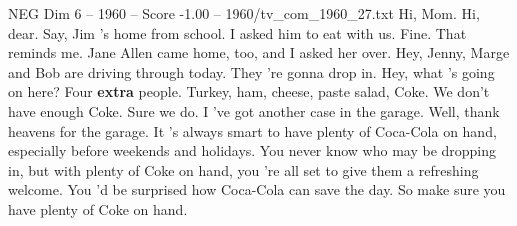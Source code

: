 \begin{textsample}{NEG Dim 6 – 1960 – Score -1.00 – 1960/tv\_com\_1960\_27.txt}  \label{ex:f6_neg_075}
Hi, Mom.
Hi, dear.
Say, Jim 's home from school.
I asked him to eat with us.
Fine.
That reminds me.
Jane Allen came home, too, and I asked her over.
Hey, Jenny, Marge and Bob are driving through today.
They 're gonna drop in.
Hey, what 's going on here?
Four \textbf{extra} people.
Turkey, ham, cheese, paste salad, Coke.
We don't have enough Coke.
Sure we do.
I 've got another case in the garage.
Well, thank heavens for the garage.
It 's always smart to have plenty of Coca-Cola on hand, especially before weekends and holidays.
You never know who may be dropping in, but with plenty of Coke on hand, you 're all set to give them a refreshing welcome.
You 'd be surprised how Coca-Cola can save the day.
So make sure you have plenty of Coke on hand.

\end{textsample}
